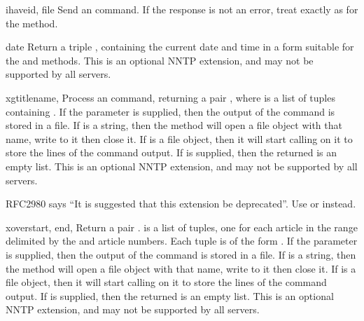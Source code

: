 \begin{methoddesc}{ihave}{id, file}
Send an  command.  If the response is not an error, treat
 exactly as for the  method.
\end{methoddesc}

\begin{methoddesc}{date}{}
Return a triple ,
containing the current date and time in a form suitable for the
 and  methods.
This is an optional NNTP extension, and may not be supported by all
servers.
\end{methoddesc}

\begin{methoddesc}{xgtitle}{name, }
Process an  command, returning a pair , where  is a list of tuples containing
.
If the  parameter is supplied, then the output of the 
 command is stored in a file.  If  is a string, 
then the method will open a file object with that name, write to it 
then close it.  If  is a file object, then it will start
calling  on it to store the lines of the command output.
If  is supplied, then the returned  is an empty list.
This is an optional NNTP extension, and may not be supported by all
servers.

RFC2980 says ``It is suggested that this extension be deprecated''.  Use
 or  instead.
\end{methoddesc}

\begin{methoddesc}{xover}{start, end, }
Return a pair .   is a list
of tuples, one for each article in the range delimited by the 
and  article numbers.  Each tuple is of the form
.
If the  parameter is supplied, then the output of the 
 command is stored in a file.  If  is a string, 
then the method will open a file object with that name, write to it 
then close it.  If  is a file object, then it will start
calling  on it to store the lines of the command output.
If  is supplied, then the returned  is an empty list.
This is an optional NNTP extension, and may not be supported by all
servers.
\end{methoddesc}

